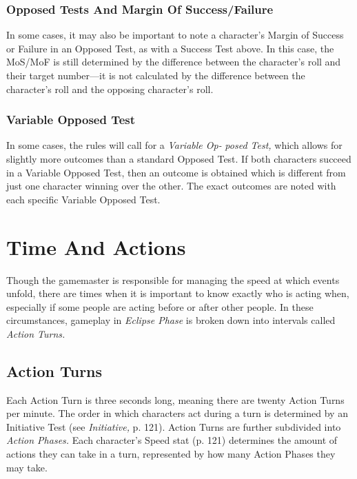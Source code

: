 \subsubsection{Opposed Tests And Margin Of Success/Failure}

In some cases, it may also be important to note a character's
Margin of Success or Failure in an Opposed
Test, as with a Success Test above. In this case, the 
MoS/MoF is still determined by the difference between 
the character's roll and their target number—it is not 
calculated by the difference between the character's 
roll and the opposing character's roll.

\subsubsection{Variable Opposed Test}

In some cases, the rules will call for a \textit{Variable Op-}
\textit{posed Test,} which allows for slightly more outcomes 
than a standard Opposed Test. If both characters 
succeed in a Variable Opposed Test, then an outcome 
is obtained which is different from just one character 
winning over the other. The exact outcomes are noted 
with each specific Variable Opposed Test.

\section{Time And Actions}

Though the gamemaster is responsible for managing 
the speed at which events unfold, there are times 
when it is important to know exactly who is acting 
when, especially if some people are acting before or 
after other people. In these circumstances, gameplay 
in \textit{Eclipse Phase} is broken down into intervals called 
\textit{Action Turns.}

\subsection{Action Turns}

Each Action Turn is three seconds long, meaning 
there are twenty Action Turns per minute. The order 
in which characters act during a turn is determined 
by an Initiative Test (see \textit{Initiative,} p. 121). Action 
Turns are further subdivided into \textit{Action Phases.} Each 
character's Speed stat (p. 121) determines the amount 
of actions they can take in a turn, represented by how 
many Action Phases they may take.

